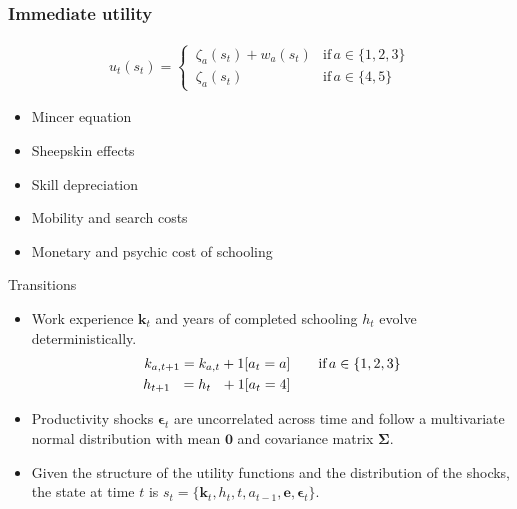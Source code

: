 \begin{frame}\frametitle{Immediate utility}\vspace{0.3cm}

  \begin{multicols}{2}

  \begin{align*}
  u_t(s_t) =
  \begin{cases}
      \,\zeta_a(s_t)  + w_a(s_t)   & \text{if}\, a \in \{1, 2, 3\}  \\[0.2cm]
      \,\zeta_a(s_t)                 &  \text{if}\, a \in \{4, 5\}
  \end{cases}
  \end{align*}

  \columnbreak


  \vspace{0.3cm}
  \begin{itemize}\setlength\itemsep{1em}
     \item Mincer equation
     \item Sheepskin effects
     \item Skill depreciation
     \item Mobility and search costs
     \item Monetary and psychic cost of schooling
  \end{itemize}

\end{multicols}

\end{frame}
\begin{frame}{Transitions}\vspace{0.25cm}

\begin{itemize}\setlength\itemsep{1em}
  \item Work experience $\bm{k}_t$  and years of completed schooling $h_t$ evolve deterministically.
  \begin{align*}
  k_{a,t+1} = k_{a,t} + 1[a_t = a]  &\qquad \text{if}\, a \in \{1, 2, 3\} \\
  h_{t + 1\phantom{,a}} = h_{t\phantom{,a}} +   1[a_t = 4]  &\qquad
  \end{align*}


  \item Productivity shocks $\bm{\epsilon}_t$ are uncorrelated across time and follow a multivariate normal distribution with mean $\bm{0}$ and covariance matrix $\bm{\Sigma}$.

  \item Given the structure of the utility functions and the distribution of the shocks, the state at time $t$ is $s_t = \{\bm{k}_t, h_t, t, a_{t -1}, \bm{e},\bm{\epsilon}_t\}$.
\end{itemize}

\end{frame}
